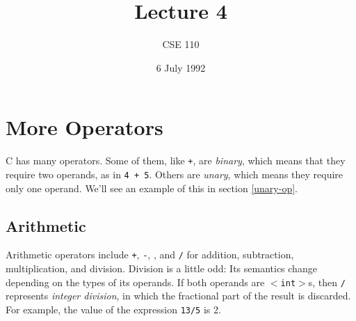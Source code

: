 %
%
%


\def\brac#1{$<$#1$>$}
\def\Int{{\tt int}}
\def\int{\brac{\Int}}
\def\int{\brac{\Int}}
\def\Shortint{{\tt short~int}}
\def\shortint{\brac{\Shortint}}
\def\Longint{{\tt long~int}}
\def\longint{\brac{\Longint}}
\def\Float{{\tt float}}
\def\float{\brac{\Float}}
\def\Double{{\tt double}}
\def\double{\brac{\Double}}
\def\Char{{\tt char}}
\def\chr{\brac{\Char}}
\def\Void{{\tt void}}
\def\void{\brac{\Void}}

\def\p2#1{\brac{pointer~to #1}}

\parskip 8pt

\title{Lecture 4}
\author{CSE 110}
\date{6 July 1992}

\pagestyle{fancy}
\rhead{\thepage}
\cfoot{}





\maketitle

\section{More Operators}

    C has many operators.  Some of them, like {\tt +}, are {\em binary},
which means that they require two operands, as in {\tt 4 + 5}.  Others
are {\em unary}, which means they require only one operand.  We'll see
an example of this in section \ref{unary-op}.

\subsection{Arithmetic}

    Arithmetic operators include {\tt +}, {\tt -}, {\tt *}, and {\tt /}
for addition, subtraction, multiplication, and division.  Division is a
little odd: Its semantics change depending on the types of its operands.
If both operands are \int s, then {\tt /} represents {\em integer
division}, in which the fractional part of the result is discarded.  For
example, the value of the expression {\tt 13/5} is 2.

